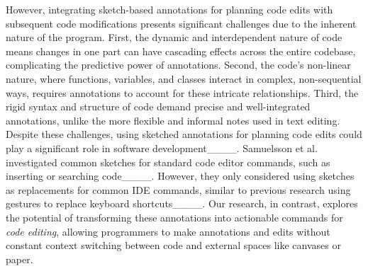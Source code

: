 However, integrating sketch-based annotations for planning code edits with subsequent code modifications presents significant challenges due to the inherent nature of the program.
First, the dynamic and interdependent nature of code means changes in one part can have cascading effects across the entire codebase, complicating the predictive power of annotations. Second, the code's non-linear nature, where functions, variables, and classes interact in complex, non-sequential ways, requires annotations to account for these intricate relationships. Third, the rigid syntax and structure of code demand precise and well-integrated annotations, unlike the more flexible and informal notes used in text editing.
Despite these challenges, using sketched annotations for planning code edits could play a significant role in software development____.
Samuelsson et al. investigated common sketches for standard code editor commands, such as inserting or searching code____. However, they only considered using sketches as replacements for common IDE commands, similar to previous research using gestures to replace keyboard shortcuts____.
Our research, in contrast, explores the potential of transforming these annotations into actionable commands for \textit{code editing}, allowing programmers to make annotations and edits without constant context switching between code and external spaces like canvases or paper.






